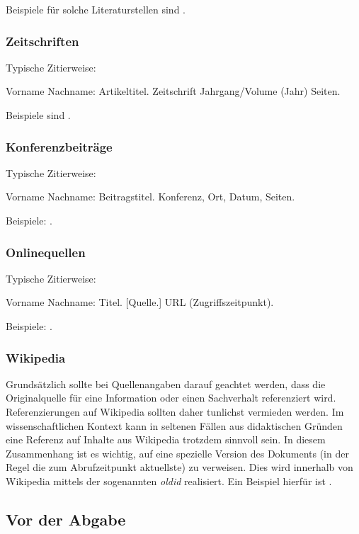 \documentclass[12pt]{scrartcl}
\begin{document}
Beispiele für solche Literaturstellen sind \cite{Beut2009, ScWe2007}.

\subsubsection{Zeitschriften}

Typische Zitierweise:

Vorname Nachname: Artikeltitel. Zeitschrift Jahrgang/Volume (Jahr) Seiten.

Beispiele sind \cite{Kili2006,Lamp1981}.

\subsubsection{Konferenzbeiträge}

Typische Zitierweise:

Vorname Nachname: Beitragstitel. Konferenz, Ort, Datum, Seiten.

Beispiele: \cite{InBr2009,WWPK2010,HSFN2009}.

\subsubsection{Onlinequellen}

Typische Zitierweise:

Vorname Nachname: Titel. {[}Quelle.{]} URL (Zugriffszeitpunkt).

Beispiele: \cite{CCC2009,Heise2011,textwahrnehmung}.

\subsubsection{Wikipedia}

Grundsätzlich sollte bei Quellenangaben darauf geachtet werden, dass die Originalquelle für eine Information oder einen Sachverhalt referenziert wird. Referenzierungen auf Wikipedia sollten daher tunlichst vermieden werden. Im wissenschaftlichen Kontext kann in seltenen Fällen aus didaktischen Gründen eine Referenz auf Inhalte aus Wikipedia trotzdem sinnvoll sein. In diesem Zusammenhang ist es wichtig, auf eine spezielle Version des Dokuments (in der Regel die zum Abrufzeitpunkt aktuellste) zu verweisen. Dies wird innerhalb von Wikipedia mittels der sogenannten \emph{oldid} realisiert. Ein Beispiel hierfür ist \cite{Wiki}.

\subsection{Vor der Abgabe}
\end{document}
